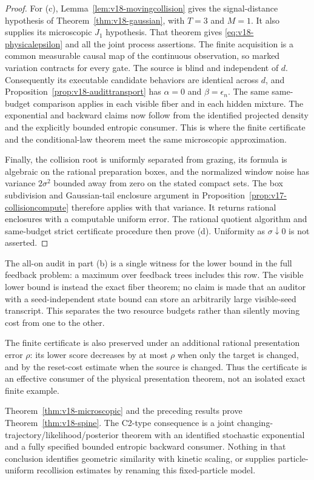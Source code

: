\begin{proof}
For (c), Lemma~\ref{lem:v18-movingcollision} gives the signal-distance
hypothesis of Theorem~\ref{thm:v18-gaussian}, with $T=3$ and $M=1$.
It also supplies its microscopic $J_1$ hypothesis. That theorem gives
\eqref{eq:v18-physicalepsilon} and all the joint process assertions.
The finite acquisition is a common measurable causal map of the continuous
observation, so marked variation contracts for every gate. The source is
blind and independent of $d$. Consequently its executable candidate
behaviors are identical across $d$, and
Proposition~\ref{prop:v18-audittransport} has $\alpha=0$ and
$\beta=\epsilon_n$. The same same-budget comparison applies in each
visible fiber and in each hidden mixture. The exponential and backward
claims now follow from the identified projected density and the explicitly
bounded entropic consumer. This is where the finite certificate and the
conditional-law theorem meet the same microscopic approximation.

Finally, the collision root is uniformly separated from grazing, its
formula is algebraic on the rational preparation boxes, and the normalized
window noise has variance $2\sigma^2$ bounded away from zero on the stated
compact sets. The box subdivision and Gaussian-tail enclosure argument
in Proposition~\ref{prop:v17-collisioncompute} therefore applies with
that variance. It returns rational enclosures with a computable uniform
error. The rational quotient algorithm and same-budget strict certificate
procedure then prove (d). Uniformity as $\sigma\downarrow0$ is not asserted.
\end{proof}

The all-on audit in part (b) is a single witness for the lower bound in the
full feedback problem: a maximum over feedback trees includes this row.
The visible lower bound is instead the exact fiber theorem; no claim is
made that an auditor with a seed-independent state bound can store an
arbitrarily large visible-seed transcript. This separates the two resource
budgets rather than silently moving cost from one to the other.

The finite certificate is also preserved under an additional rational
presentation error $\rho$: its lower score decreases by at most $\rho$
when only the target is changed, and by the reset-cost estimate when the
source is changed. Thus the certificate is an effective consumer of the
physical presentation theorem, not an isolated exact finite example.

Theorem~\ref{thm:v18-microscopic} and the preceding results prove
Theorem~\ref{thm:v18-spine}. The C2-type consequence is a joint
changing-trajectory/likelihood/posterior theorem with an identified
stochastic exponential and a fully specified bounded entropic backward
consumer. Nothing in that conclusion identifies geometric similarity with
kinetic scaling, or supplies particle-uniform recollision estimates by
renaming this fixed-particle model.
